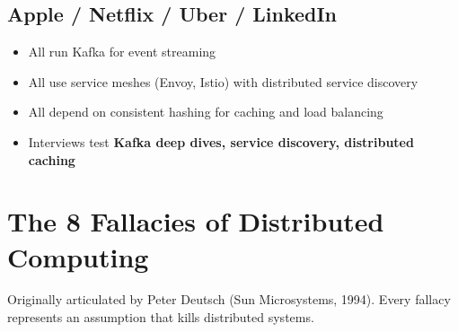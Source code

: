 \documentclass[11pt]{article}
\providecommand{\tightlist}{\setlength{\itemsep}{1pt}\setlength{\parskip}{0pt}}
\begin{document}
\subsection{Apple / Netflix / Uber / LinkedIn}\label{apple--netflix--uber--linkedin}

\begin{itemize}
\tightlist
\item
  All run Kafka for event streaming
\item
  All use service meshes (Envoy, Istio) with distributed service discovery
\item
  All depend on consistent hashing for caching and load balancing
\item
  Interviews test \textbf{Kafka deep dives, service discovery, distributed caching}
\end{itemize}

\section{The 8 Fallacies of Distributed Computing}\label{the-8-fallacies-of-distributed-computing}

Originally articulated by Peter Deutsch (Sun Microsystems, 1994). Every fallacy represents an assumption that kills distributed systems.
\end{document}
